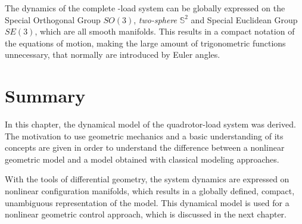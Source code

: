 The dynamics of the complete -load system can be globally expressed on the Special Orthogonal Group $SO(3)$, \textit{two-sphere} $ \mathbb{S}^2 $ and Special Euclidean Group $ SE(3) $, which are all smooth  manifolds. This results in a compact notation of the equations of motion, making the large amount of trigonometric functions unnecessary, that normally are introduced by Euler angles.


\section*{Summary}
In this chapter, the dynamical model of the quadrotor-load system was derived.
The motivation to use geometric mechanics and a basic understanding of its concepts are given in order to understand the difference between a nonlinear geometric model and a model obtained with classical modeling approaches.

With the tools of differential geometry, the system dynamics are expressed on nonlinear configuration manifolds, which results in a globally defined, compact, unambiguous representation of the model. This dynamical model is used for a nonlinear geometric control approach, which is discussed in the next chapter.
